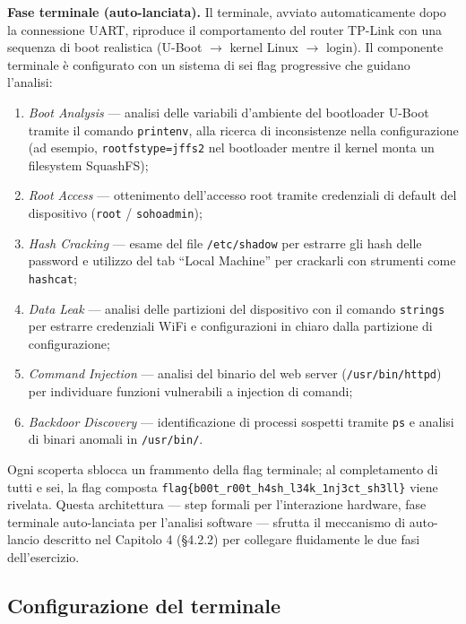 \textbf{Fase terminale (auto-lanciata).} Il terminale, avviato automaticamente dopo la connessione UART, riproduce il comportamento del router TP-Link con una sequenza di boot realistica (U-Boot $\rightarrow$ kernel Linux $\rightarrow$ login). Il componente terminale è configurato con un sistema di sei flag progressive che guidano l'analisi:

\begin{enumerate}
    \item \textit{Boot Analysis} --- analisi delle variabili d'ambiente del bootloader U-Boot tramite il comando \texttt{printenv}, alla ricerca di inconsistenze nella configurazione (ad esempio, \texttt{rootfstype=jffs2} nel bootloader mentre il kernel monta un filesystem SquashFS);
    \item \textit{Root Access} --- ottenimento dell'accesso root tramite credenziali di default del dispositivo (\texttt{root} / \texttt{sohoadmin});
    \item \textit{Hash Cracking} --- esame del file \texttt{/etc/shadow} per estrarre gli hash delle password e utilizzo del tab ``Local Machine'' per crackarli con strumenti come \texttt{hashcat};
    \item \textit{Data Leak} --- analisi delle partizioni del dispositivo con il comando \texttt{strings} per estrarre credenziali WiFi e configurazioni in chiaro dalla partizione di configurazione;
    \item \textit{Command Injection} --- analisi del binario del web server (\texttt{/usr/bin/httpd}) per individuare funzioni vulnerabili a injection di comandi;
    \item \textit{Backdoor Discovery} --- identificazione di processi sospetti tramite \texttt{ps} e analisi di binari anomali in \texttt{/usr/bin/}.
\end{enumerate}

Ogni scoperta sblocca un frammento della flag terminale; al completamento di tutti e sei, la flag composta \texttt{flag\{b00t\_r00t\_h4sh\_l34k\_1nj3ct\_sh3ll\}} viene rivelata. Questa architettura --- step formali per l'interazione hardware, fase terminale auto-lanciata per l'analisi software --- sfrutta il meccanismo di auto-lancio descritto nel Capitolo 4 (\S4.2.2) per collegare fluidamente le due fasi dell'esercizio.

\subsection{Configurazione del terminale}
\label{subsec:configurazione-terminale}

